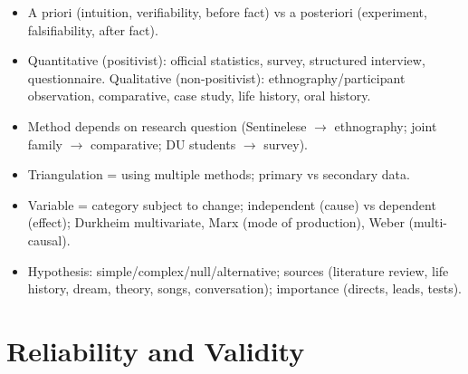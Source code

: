 \begin{QuickRevision}
\begin{itemize}
\item A priori (intuition, verifiability, before fact) vs a posteriori (experiment, falsifiability, after fact).
\item Quantitative (positivist): official statistics, survey, structured interview, questionnaire. Qualitative (non-positivist): ethnography/participant observation, comparative, case study, life history, oral history.
\item Method depends on research question (Sentinelese $\rightarrow$ ethnography; joint family $\rightarrow$ comparative; DU students $\rightarrow$ survey).
\item Triangulation = using multiple methods; primary vs secondary data.
\item Variable = category subject to change; independent (cause) vs dependent (effect); Durkheim multivariate, Marx (mode of production), Weber (multi-causal).
\item Hypothesis: simple/complex/null/alternative; sources (literature review, life history, dream, theory, songs, conversation); importance (directs, leads, tests).
\end{itemize}
\end{QuickRevision}

\section{Reliability and Validity}

